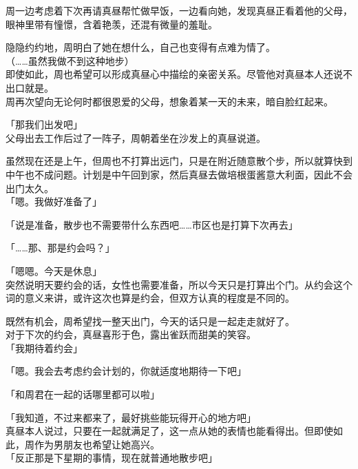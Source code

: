周一边考虑着下次再请真昼帮忙做早饭，一边看向她，发现真昼正看着他的父母，眼神里带有憧憬，含着艳羡，还混有微量的羞耻。

隐隐约约地，周明白了她在想什么，自己也变得有点难为情了。\\

（……虽然我做不到这种地步）\\

即使如此，周也希望可以形成真昼心中描绘的亲密关系。尽管他对真昼本人还说不出口就是。\\

周再次望向无论何时都很恩爱的父母，想象着某一天的未来，暗自脸红起来。\\

\vspace{2\baselineskip}

「那我们出发吧」\\

父母出去工作后过了一阵子，周朝着坐在沙发上的真昼说道。

虽然现在还是上午，但周也不打算出远门，只是在附近随意散个步，所以就算快到中午也不成问题。计划是中午回到家，然后真昼去做培根蛋酱意大利面，因此不会出门太久。\\

「嗯。我做好准备了」

「说是准备，散步也不需要带什么东西吧……市区也是打算下次再去」

「……那、那是约会吗？」

「嗯嗯。今天是休息」\\

突然说明天要约会的话，女性也需要准备，所以今天只是打算出个门。从约会这个词的意义来讲，或许这次也算是约会，但双方认真的程度是不同的。

既然有机会，周希望找一整天出门，今天的话只是一起走走就好了。\\

对于下次的约会，真昼喜形于色，露出雀跃而甜美的笑容。\\

「我期待着约会」

「嗯。我会去考虑约会计划的，你就适度地期待一下吧」

「和周君在一起的话哪里都可以啦」

「我知道，不过来都来了，最好挑些能玩得开心的地方吧」\\

真昼本人说过，只要在一起就满足了，这一点从她的表情也能看得出。但即使如此，周作为男朋友也希望让她高兴。\\

「反正那是下星期的事情，现在就普通地散步吧」

